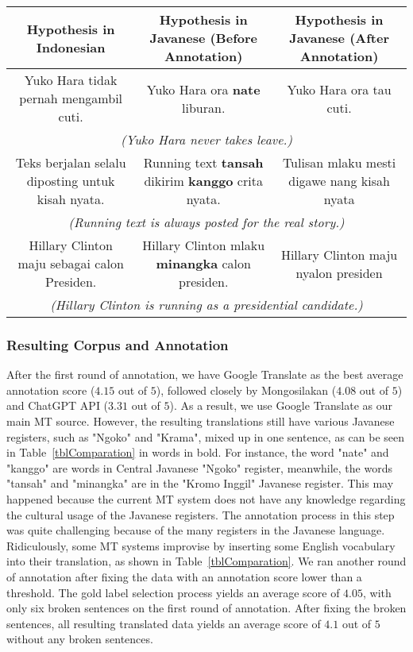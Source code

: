 \documentclass[a4paper, conference]{IEEEtran}
\begin{document}
\begin{table*}[!t]
\begin{center}
\begin{tabular}{ccc}
\hline
\textbf{Hypothesis in Indonesian} & \textbf{Hypothesis in Javanese (Before Annotation)} & \textbf{Hypothesis in Javanese (After Annotation)} \\
\hline
Yuko Hara tidak pernah mengambil cuti. & Yuko Hara ora \textbf{nate} liburan. & Yuko Hara ora tau cuti. \\
\multicolumn{3}{c}{\textit{(Yuko Hara never takes leave.)}} \\ 
\hline
Teks berjalan selalu diposting untuk kisah nyata. & Running text \textbf{tansah} dikirim \textbf{kanggo} crita nyata. & Tulisan mlaku mesti digawe nang kisah nyata \\
\multicolumn{3}{c}{\textit{(Running text is always posted for the real story.)}} \\ 
\hline
Hillary Clinton maju sebagai calon Presiden. & Hillary Clinton mlaku \textbf{minangka} calon presiden. & Hillary Clinton maju nyalon presiden \\
\multicolumn{3}{c}{\textit{(Hillary Clinton is running as a presidential candidate.)}} \\ 
\hline
\end{tabular}
\captionsetup{labelformat=default}
\caption{Sample of translated data straight from MT system (the "Before Annotation" column) and data that has been annotated into East Javanese "Ngoko" registers.}
\label{tblComparation}
\end{center}
\end{table*}

\subsubsection{Resulting Corpus and Annotation}\label{resultingCorpus}
After the first round of annotation, we have Google Translate as the best average annotation score ($4.15$ out of $5$), followed closely by Mongosilakan ($4.08$ out of $5$) and ChatGPT API ($3.31$ out of $5$). As a result, we use Google Translate as our main MT source. However, the resulting translations still have various Javanese registers, such as "Ngoko" and "Krama", mixed up in one sentence, as can be seen in Table~\ref{tblComparation} in words in bold. For instance, the word "nate" and "kanggo" are words in Central Javanese "Ngoko" register, meanwhile, the words "tansah" and "minangka" are in the "Kromo Inggil" Javanese register. This may happened because the current MT system does not have any knowledge regarding the cultural usage of the Javanese registers. The annotation process in this step was quite challenging because of the many registers in the Javanese language. Ridiculously, some MT systems improvise by inserting some English vocabulary into their translation, as shown in Table~\ref{tblComparation}. We ran another round of annotation after fixing the data with an annotation score lower than a threshold. The gold label selection process yields an average score of $4.05$, with only six broken sentences on the first round of annotation. After fixing the broken sentences, all resulting translated data yields an average score of $4.1$ out of $5$ without any broken sentences.
\end{document}
